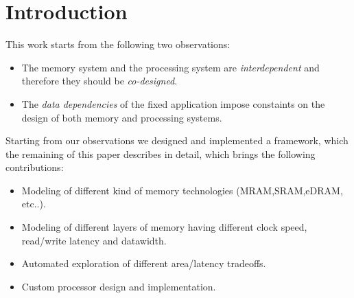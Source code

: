 \section{Introduction}
This work starts from the following two observations:
\begin{itemize}
\item The memory system and the processing system are \textit{interdependent} and therefore they should be \textit{co-designed}.
\item The \textit{data dependencies} of the fixed application impose constaints on the design of both memory and processing systems.
\end{itemize}

Starting from our observations we designed and implemented a framework, which the remaining of this paper describes in detail, which brings the following contributions:
\begin{itemize}
\item Modeling of different kind of memory technologies (MRAM,SRAM,eDRAM, etc..).
\item Modeling of different layers of memory having different clock speed, read/write latency and datawidth.
\item Automated exploration of different area/latency tradeoffs.
\item Custom processor design and implementation.
\end{itemize}
